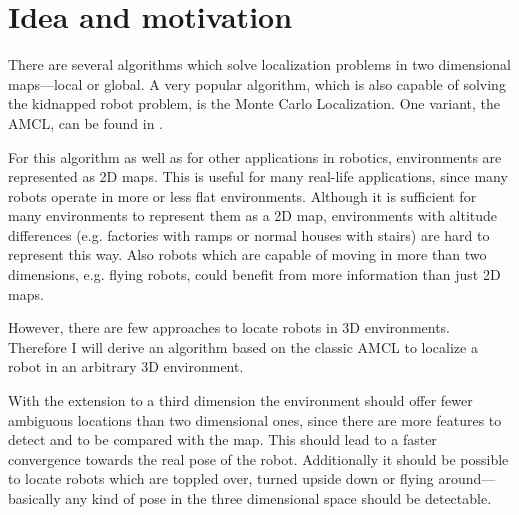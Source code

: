 \documentclass[Thesis.tex]{subfiles}
\begin{document}
\section{Idea and motivation}

There are several algorithms which solve localization problems in two dimensional maps---local or global. A very popular algorithm, which is also capable of solving the kidnapped robot problem, is the Monte Carlo Localization\cite[]{DellaertFoxBurgardThrun:1999}. One variant, the \gls{AMCL}, can be found in \citet{ThrunBurgardFox:2005}.

For this algorithm as well as for other applications in robotics, environments are represented as 2D maps. This is useful for many real-life applications, since many robots operate in more or less flat environments. Although it is sufficient for many environments to represent them as a 2D map, environments with altitude differences (e.g. factories with ramps or normal houses with stairs) are hard to represent this way. Also robots which are capable of moving in more than two dimensions, e.g. flying robots, could benefit from more information than just 2D maps.

However, there are few approaches to locate robots in 3D environments. Therefore I will derive an algorithm based on the classic \gls{AMCL} to localize a robot in an arbitrary 3D environment.

With the extension to a third dimension the environment should offer fewer ambiguous locations than two dimensional ones, since there are more features to detect and to be compared with the map. This should lead to a faster convergence towards the real pose of the robot. Additionally it should be possible to locate robots which are toppled over, turned upside down or flying around---basically any kind of pose in the three dimensional space should be detectable.
\end{document}
